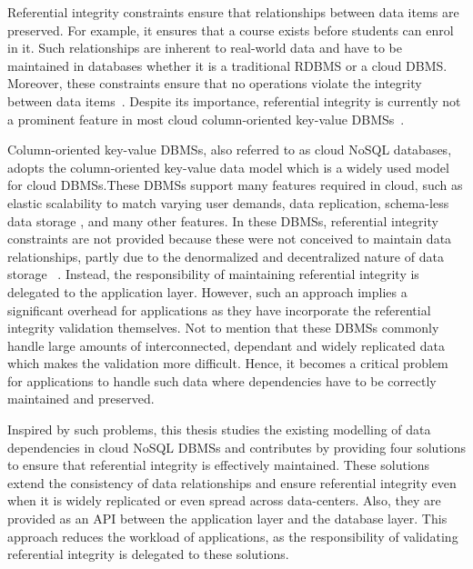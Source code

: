 Referential integrity constraints  ensure that  relationships between data items
are preserved. For example, it ensures that a course exists before students can
enrol in it. Such relationships are inherent to real-world data and have to be
maintained in databases whether it is a traditional \ac{RDBMS} or a cloud
\ac{DBMS}. Moreover, these constraints  ensure that no operations violate  the
integrity between  data items~\citep{Navathe}.   Despite its importance,
referential integrity is currently not a prominent feature in most  cloud
column-oriented key-value \acp{DBMS}~\citep{Shietal,Stonebraker2}.
   
   
Column-oriented key-value \acp{DBMS}, also  referred  to as cloud
\ac{NoSQL} databases,  adopts the column-oriented key-value data model which is
a widely used model for cloud \acp{DBMS}.These \acp{DBMS}  support many features
required in cloud,  such as elastic scalability to match varying user demands,
data replication,  schema-less data storage ,   and many other features. In
these \acp{DBMS},  referential integrity constraints are not provided because
these were not conceived to maintain data relationships, partly due to the
denormalized and decentralized nature of data storage ~\citep{Navathe}.
Instead, the responsibility of maintaining referential integrity is delegated to
the application layer. However, such an approach implies a significant overhead
for applications as they have incorporate the referential integrity validation
themselves. Not to mention that these \acp{DBMS} commonly handle large amounts
of interconnected, dependant and widely replicated data which makes the
validation more difficult. Hence, it becomes a  critical problem for
applications to handle such  data where dependencies have to be correctly
maintained and preserved.
   
   
Inspired by such problems, this thesis studies the existing modelling of data
dependencies in cloud \ac{NoSQL}  \acp{DBMS}  and contributes by providing four
solutions to ensure  that referential integrity is effectively maintained. These
solutions  extend the consistency of data relationships and  ensure  referential
integrity even when it is widely replicated or even spread across data-centers.
Also, they are provided as an \ac{API} between the application layer and the
database layer. This approach reduces the workload of applications, as the
responsibility of validating referential integrity is delegated to these
solutions.
   


